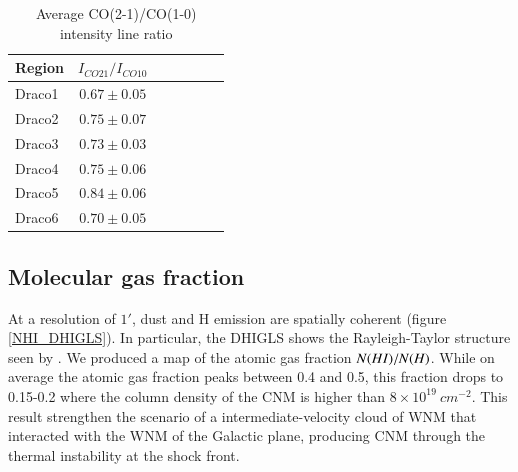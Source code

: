 \documentclass[traditabstract]{aa}
\begin{document}
\begin{table}[h]
  \centering
  \footnotesize
  \caption{Average CO(2-1)/CO(1-0) intensity line ratio}
  \begin{tabular}{lcccccc}
    \hline \hline
    Region & $I_{CO21}/I_{CO10}$ \\ \hline
    Draco1 &   $0.67\pm 0.05$    \\
    Draco2 &   $0.75\pm 0.07$    \\
    Draco3 &   $0.73\pm 0.03$    \\
    Draco4 &   $0.75\pm 0.06$    \\
    Draco5 &   $0.84\pm 0.06$    \\
    Draco6 &   $0.70\pm 0.05$    \\ \hline
  \end{tabular}
\end{table}


   \subsection{Molecular gas fraction}

   At a resolution of $1'$, dust and H emission are spatially coherent (figure \ref{NHI_DHIGLS}). In particular, the DHIGLS shows the Rayleigh-Taylor structure seen by \cite{MAMD_2017b}. We produced a map of the atomic gas fraction $N(H\rmnum{1})/N(H)$. While on average the atomic gas fraction peaks between 0.4 and 0.5, this fraction drops to 0.15-0.2 where the column density of the CNM is higher than $8\times 10^{19}\: cm^{-2}$. This result strengthen the scenario of a intermediate-velocity cloud of WNM that interacted with the WNM of the Galactic plane, producing CNM through the thermal instability at the shock front.
\end{document}
